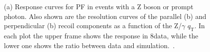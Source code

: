 \begin{figure}[!htb]
\begin{center}
\end{center} 
\caption{(a) Response curves for PF \ptvecmiss in events with a Z boson or prompt photon.
Also shown are the resolution curves of the parallel (b) and perpendicular (b) recoil components as a function of the Z/$\gamma$ $q_\mathrm{T}$. 
In each plot the upper frame shows the response in 8\TeV data, while the lower one shows the ratio between data and simulation.~\cite{Khachatryan:2014gga}.}
\label{fig:met_resol}
\end{figure}
